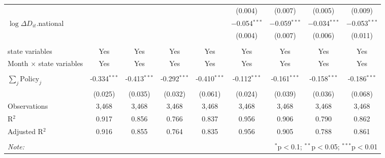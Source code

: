 \begin{tabular}{@{\extracolsep{1pt}}lcccccccc}
  &  &  &  &  & (0.004) & (0.007) & (0.005) & (0.009) \\ 
  $\log \Delta D_{it}$.national &  &  &  &  & $-$0.054$^{***}$ & $-$0.059$^{***}$ & $-$0.034$^{***}$ & $-$0.053$^{***}$ \\ 
  &  &  &  &  & (0.004) & (0.007) & (0.006) & (0.011) \\ 
 \hline \\[-1.8ex] 
state variables & Yes & Yes & Yes & Yes & Yes & Yes & Yes & Yes \\ 
Month $\times$ state variables & Yes & Yes & Yes & Yes & Yes & Yes & Yes & Yes \\ 
\hline \\[-1.8ex] 
$\sum_j \mathrm{Policy}_j$ & -0.334$^{***}$ & -0.413$^{***}$ & -0.292$^{***}$ & -0.410$^{***}$ & -0.112$^{***}$ & -0.161$^{***}$ & -0.158$^{***}$ & -0.186$^{***}$ \\ 
 & (0.025) & (0.035) & (0.032) & (0.061) & (0.024) & (0.039) & (0.036) & (0.068) \\ 
Observations & 3,468 & 3,468 & 3,468 & 3,468 & 3,468 & 3,468 & 3,468 & 3,468 \\ 
R$^{2}$ & 0.917 & 0.856 & 0.766 & 0.837 & 0.956 & 0.906 & 0.790 & 0.862 \\ 
Adjusted R$^{2}$ & 0.916 & 0.855 & 0.764 & 0.835 & 0.956 & 0.905 & 0.788 & 0.861 \\ 
\hline 
\hline \\[-1.8ex] 
\textit{Note:}  & \multicolumn{8}{r}{$^{*}$p$<$0.1; $^{**}$p$<$0.05; $^{***}$p$<$0.01} \\ 
\end{tabular} 